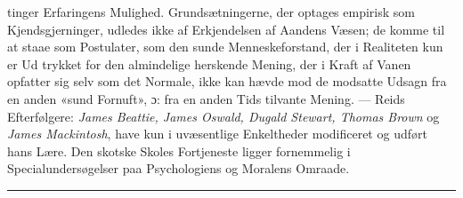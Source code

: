 \documentclass[12pt,a4paper]{book}
\newcommand{\divrule}{\begin{center}\rule{2cm}{0.4pt}\end{center}}
\begin{document}
tinger Erfaringens Mulighed. Grundsætningerne, der optages
empirisk som Kjendsgjerninger, udledes ikke af Erkjendelsen
af Aandens Væsen; de komme til at staae som Postulater, som
den sunde Menneskeforstand, der i Realiteten kun er Ud\-%
trykket for den almindelige herskende Mening, der i Kraft af
Vanen opfatter sig selv som det Normale, ikke kan hævde
mod de modsatte Udsagn fra en anden «sund Fornuft», ɔ: fra
en anden Tids tilvante Mening. --- Reids Efterfølgere: \emph{James
Beattie, James Oswald, Dugald Stewart, Thomas
Brown} og \emph{James Mackintosh}, have kun i uvæsentlige
Enkeltheder modificeret og udført hans Lære. Den skotske
Skoles Fortjeneste ligger fornemmelig i Specialundersøgelser
paa Psychologiens og Moralens Omraade.

\divrule
\end{document}
